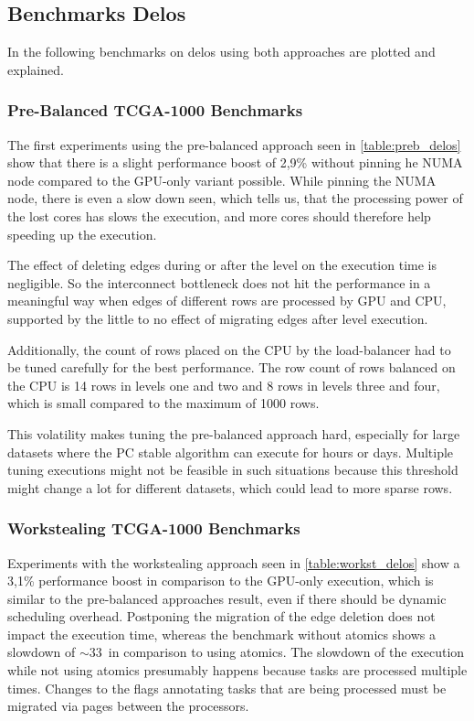\subsection{Benchmarks Delos}
In the following benchmarks on delos using both approaches are plotted and explained.

\subsubsection{Pre-Balanced TCGA-1000 Benchmarks}

The first experiments using the pre-balanced approach seen in \ref{table:preb_delos} show that there is a slight performance boost of 2,9\% without pinning he NUMA node compared to the GPU-only variant possible. While pinning the NUMA node, there is even a slow down seen, which tells us, that the processing power of the lost cores has slows the execution, and more cores should therefore help speeding up the execution. 

The effect of deleting edges during or after the level on the execution time  is negligible. So the interconnect bottleneck does not hit the performance in a meaningful way when edges of different rows are processed by GPU and CPU, supported by the little to no effect of migrating edges after level execution. 

Additionally, the count of rows placed on the CPU by the load-balancer had to be tuned carefully for the best performance. The row count of rows balanced on the CPU is 14 rows in levels one and two and 8 rows in levels three and four, which is small compared to the maximum of 1000 rows.

This volatility makes tuning the pre-balanced approach hard, especially for large datasets where the PC stable algorithm can execute for hours or days. Multiple tuning executions might not be feasible in such situations because this threshold might change a lot for different datasets, which could lead to more sparse rows.

\subsubsection{Workstealing TCGA-1000 Benchmarks}

Experiments with the workstealing approach seen in \ref{table:workst_delos} show a 3,1\% performance boost in comparison to the GPU-only execution, which is similar to the pre-balanced approaches result, even if there should be dynamic scheduling overhead. Postponing the migration of the edge deletion does not impact the execution time, whereas the benchmark without atomics shows a slowdown of $\sim$33\ in comparison to using atomics. The slowdown of the execution while not using atomics presumably happens because tasks are processed multiple times. Changes to the flags annotating tasks that are being processed must be migrated via pages between the processors.

